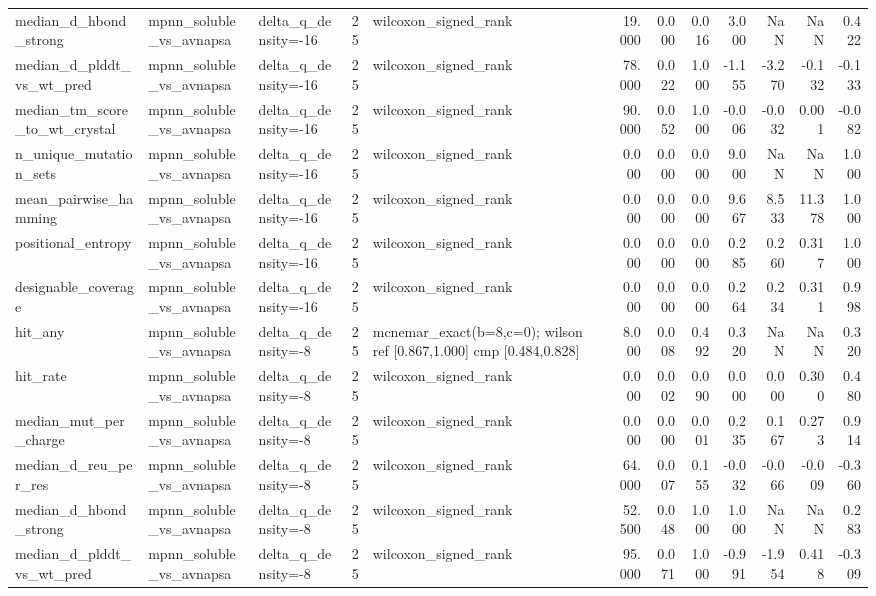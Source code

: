 \begin{table}
{\begin{tabular}{lllrlrrrrrrr}
median\_d\_hbond\_strong & mpnn\_soluble\_vs\_avnapsa & delta\_q\_density=-16 & 25 & wilcoxon\_signed\_rank & 19.000 & 0.000 & 0.016 & 3.000 & NaN & NaN & 0.422 \\
median\_d\_plddt\_vs\_wt\_pred & mpnn\_soluble\_vs\_avnapsa & delta\_q\_density=-16 & 25 & wilcoxon\_signed\_rank & 78.000 & 0.022 & 1.000 & -1.155 & -3.270 & -0.132 & -0.133 \\
median\_tm\_score\_to\_wt\_crystal & mpnn\_soluble\_vs\_avnapsa & delta\_q\_density=-16 & 25 & wilcoxon\_signed\_rank & 90.000 & 0.052 & 1.000 & -0.006 & -0.032 & 0.001 & -0.082 \\
n\_unique\_mutation\_sets & mpnn\_soluble\_vs\_avnapsa & delta\_q\_density=-16 & 25 & wilcoxon\_signed\_rank & 0.000 & 0.000 & 0.000 & 9.000 & NaN & NaN & 1.000 \\
mean\_pairwise\_hamming & mpnn\_soluble\_vs\_avnapsa & delta\_q\_density=-16 & 25 & wilcoxon\_signed\_rank & 0.000 & 0.000 & 0.000 & 9.667 & 8.533 & 11.378 & 1.000 \\
positional\_entropy & mpnn\_soluble\_vs\_avnapsa & delta\_q\_density=-16 & 25 & wilcoxon\_signed\_rank & 0.000 & 0.000 & 0.000 & 0.285 & 0.260 & 0.317 & 1.000 \\
designable\_coverage & mpnn\_soluble\_vs\_avnapsa & delta\_q\_density=-16 & 25 & wilcoxon\_signed\_rank & 0.000 & 0.000 & 0.000 & 0.264 & 0.234 & 0.311 & 0.998 \\
hit\_any & mpnn\_soluble\_vs\_avnapsa & delta\_q\_density=-8 & 25 & mcnemar\_exact(b=8,c=0); wilson ref [0.867,1.000] cmp [0.484,0.828] & 8.000 & 0.008 & 0.492 & 0.320 & NaN & NaN & 0.320 \\
hit\_rate & mpnn\_soluble\_vs\_avnapsa & delta\_q\_density=-8 & 25 & wilcoxon\_signed\_rank & 0.000 & 0.002 & 0.090 & 0.000 & 0.000 & 0.300 & 0.480 \\
median\_mut\_per\_charge & mpnn\_soluble\_vs\_avnapsa & delta\_q\_density=-8 & 25 & wilcoxon\_signed\_rank & 0.000 & 0.000 & 0.001 & 0.235 & 0.167 & 0.273 & 0.914 \\
median\_d\_reu\_per\_res & mpnn\_soluble\_vs\_avnapsa & delta\_q\_density=-8 & 25 & wilcoxon\_signed\_rank & 64.000 & 0.007 & 0.155 & -0.032 & -0.066 & -0.009 & -0.360 \\
median\_d\_hbond\_strong & mpnn\_soluble\_vs\_avnapsa & delta\_q\_density=-8 & 25 & wilcoxon\_signed\_rank & 52.500 & 0.048 & 1.000 & 1.000 & NaN & NaN & 0.283 \\
median\_d\_plddt\_vs\_wt\_pred & mpnn\_soluble\_vs\_avnapsa & delta\_q\_density=-8 & 25 & wilcoxon\_signed\_rank & 95.000 & 0.071 & 1.000 & -0.991 & -1.954 & 0.418 & -0.309 \\

\end{tabular}}
\end{table}
